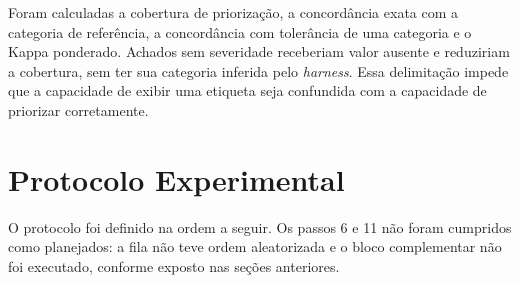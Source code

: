 Foram calculadas a cobertura de priorização, a concordância exata com a categoria de referência, a concordância com tolerância de uma categoria e o Kappa ponderado. Achados sem severidade receberiam valor ausente e reduziriam a cobertura, sem ter sua categoria inferida pelo \textit{harness}. Essa delimitação impede que a capacidade de exibir uma etiqueta seja confundida com a capacidade de priorizar corretamente.

\section{Protocolo Experimental}\label{sec:protocolo-experimental}

O protocolo foi definido na ordem a seguir. Os passos 6 e 11 não foram cumpridos como planejados: a fila não teve ordem aleatorizada e o bloco complementar não foi executado, conforme exposto nas seções anteriores.

